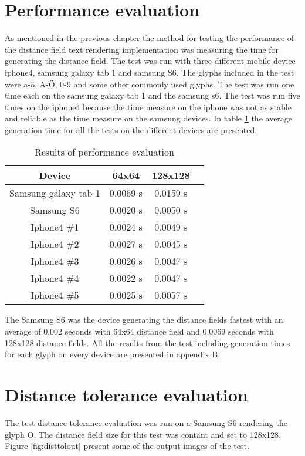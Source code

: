 \section{Performance evaluation}
As mentioned in the previous chapter the method for testing the performance of the distance field text rendering implementation was measuring the time for generating the distance field. The test was run with three different mobile device iphone4, samsung galaxy tab 1 and samsung S6. The glyphs included in the test were a-ö, A-Ö, 0-9 and some other commonly used glyphs. The test was run one time each on the samsung galaxy tab 1 and the samsung s6. The test was run five times on the iphone4 because the time measure on the iphone was not as stable and reliable as the time measure on the samsung devices. In table \ref{table:perfeval} the average generation time for all the tests on the different devices are presented.

\begin{table}[H]
\caption{Results of performance evaluation}
\centering
\begin{tabular}{c c c c}
\hline
\hline %
Device & 64x64 & 128x128\\ [0.5ex] %
\hline
Samsung galaxy tab 1 & 0.0069 s & 0.0159 s \\
Samsung S6 & 0.0020 s & 0.0050 s \\
Iphone4 \#1 & 0.0024 s & 0.0049 s \\
Iphone4 \#2 & 0.0027 s & 0.0045 s \\
Iphone4 \#3 & 0.0026 s & 0.0047 s \\
Iphone4 \#4 & 0.0022 s & 0.0047 s \\
Iphone4 \#5 & 0.0025 s & 0.0057 s \\ [1ex]
\hline
\end{tabular}
\label{table:perfeval}
\end{table}
The Samsung S6 was the device generating the distance fields fastest with an average of 0.002 seconds with 64x64 distance field and 0.0069 seconds with 128x128 distance fields. All the results from the test including generation times for each glyph on every device are presented in appendix B.
\section{Distance tolerance evaluation}
The test distance tolerance evaluation was run on a Samsung S6 rendering the glyph O. The distance field size for this test was contant and set to 128x128. Figure \ref{fig:disttolout} present some of the output images of the test.

